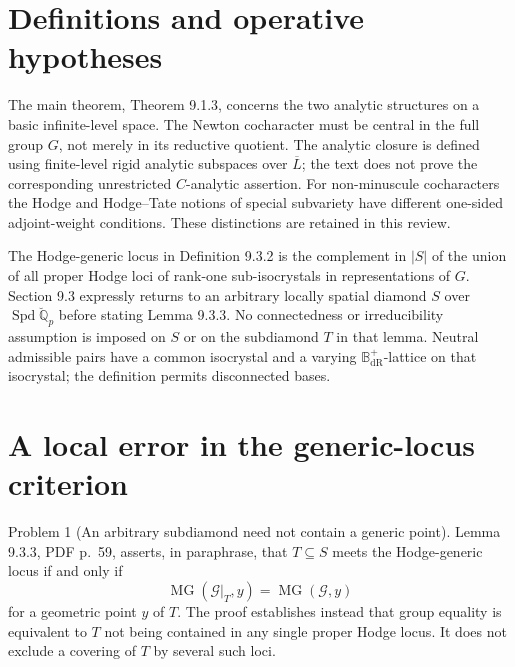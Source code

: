 \documentclass[10pt]{article}
\begin{document}
\section*{Definitions and operative hypotheses}
The main theorem, Theorem 9.1.3, concerns the two analytic structures on a basic infinite-level space. The Newton cocharacter must be central in the full group \(G\), not merely in its reductive quotient. The analytic closure is defined using finite-level rigid analytic subspaces over \(\overline L\); the text does not prove the corresponding unrestricted \(C\)-analytic assertion. For non-minuscule cocharacters the Hodge and Hodge–Tate notions of special subvariety have different one-sided adjoint-weight conditions. These distinctions are retained in this review.\par
The Hodge-generic locus in Definition 9.3.2 is the complement in \(|S|\) of the union of all proper Hodge loci of rank-one sub-isocrystals in representations of \(G\). Section 9.3 expressly returns to an arbitrary locally spatial diamond \(S\) over \(\operatorname{Spd}\breve{\mathbb Q}_p\) before stating Lemma 9.3.3. No connectedness or irreducibility assumption is imposed on \(S\) or on the subdiamond \(T\) in that lemma. Neutral admissible pairs have a common isocrystal and a varying \(\mathbb B_{\mathrm{dR}}^+\)-lattice on that isocrystal; the definition permits disconnected bases.\par
\section*{A local error in the generic-locus criterion}
Problem 1 (An arbitrary subdiamond need not contain a generic point).  Lemma 9.3.3, PDF p. 59, asserts, in paraphrase, that \(T\subseteq S\) meets the Hodge-generic locus if and only if \[\operatorname{MG}(\mathcal G|_T,y)=\operatorname{MG}(\mathcal G,y)\] for a geometric point \(y\) of \(T\). The proof establishes instead that group equality is equivalent to \(T\) not being contained in any single proper Hodge locus. It does not exclude a covering of \(T\) by several such loci.\par
\end{document}
